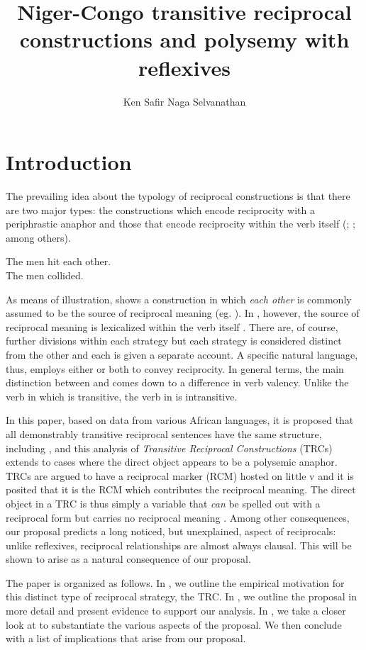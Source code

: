 \documentclass[output=paper]{langsci/langscibook}
\title{Niger-Congo transitive reciprocal constructions and polysemy with reflexives}
\author{%
Ken Safir\affiliation{Rutgers University}\lastand 
Naga Selvanathan \affiliation{Rutgers University} 
}
\begin{document}
\section{Introduction}

The prevailing idea about the typology of reciprocal constructions is that there are two major types: the constructions which encode reciprocity with a periphrastic anaphor and those that encode reciprocity within the verb itself (\citealt{KönigGast2008}; \citealt{Siloni2012}; among others).

\ea\label{ex:safir:1}
\ea\label{ex:safir:1a}
The men hit each other.  \\
\ex\label{ex:safir:1b}
The men collided.\\
\z
\z

As means of illustration,  shows a construction in which \textit{each other} is commonly assumed to be the source of reciprocal meaning (eg. \citealt{HeimEtAl1991}). In , however, the source of reciprocal meaning is lexicalized within the verb itself \citep{Siloni2012}.  There are, of course, further divisions within each strategy but each strategy is considered distinct from the other and each is given a separate account. A specific natural language, thus, employs either or both to convey reciprocity. In general terms, the main distinction between  and  comes down to a difference in verb valency. Unlike the verb in  which is transitive, the verb in  is intransitive.

In this paper, based on data from various African languages, it is proposed that all demonstrably transitive reciprocal sentences have the same structure, including , and this analysis of \textit{Transitive Reciprocal Constructions} (TRCs) extends to cases where the direct object appears to be a polysemic anaphor. TRCs are argued to have a reciprocal marker (RCM) hosted on little v and it is posited that it is the RCM which contributes the reciprocal meaning. The direct object in a TRC is thus simply a variable that \textit{can} be spelled out with a reciprocal form but carries no reciprocal meaning \citep{Safir2014}. Among other consequences, our proposal predicts a long noticed, but unexplained, aspect of reciprocals: unlike reflexives, reciprocal relationships are almost always clausal. This will be shown to arise as a natural consequence of our proposal.
 
The paper is organized as follows. In , we outline the empirical motivation for this distinct type of reciprocal strategy, the TRC. In , we outline the proposal in more detail and present evidence to support our analysis. In , we take a closer look at  to substantiate the various aspects of the proposal. We then conclude with a list of implications that arise from our proposal.
\end{document}
